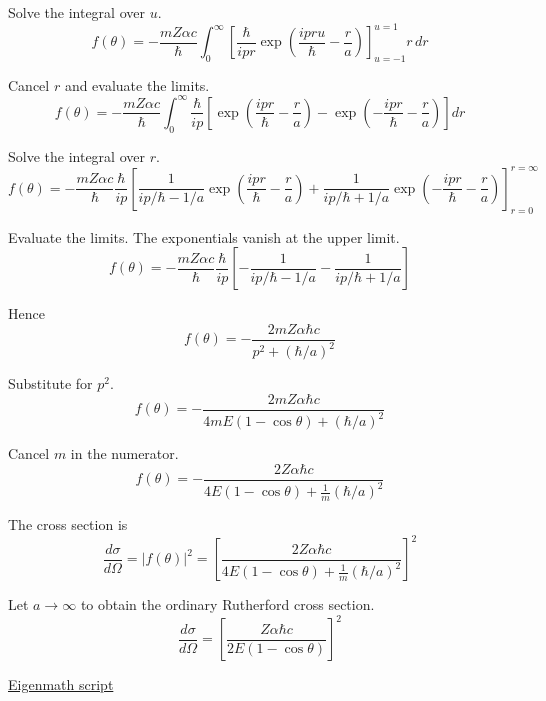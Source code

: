 Solve the integral over $u$.
\begin{equation*}
f(\theta)=-\frac{mZ\alpha c}{\hbar}
\int_0^\infty
\left[\frac{\hbar}{ipr}\exp\left(\frac{ipru}{\hbar}-\frac{r}{a}\right)\right]_{u=-1}^{u=1}
r\,dr
\end{equation*}

Cancel $r$ and evaluate the limits.
\begin{equation*}
f(\theta)=-\frac{mZ\alpha c}{\hbar}
\int_0^\infty
\frac{\hbar}{ip}
\left[\exp\left(\frac{ipr}{\hbar}-\frac{r}{a}\right)
-\exp\left(-\frac{ipr}{\hbar}-\frac{r}{a}\right)\right]
dr
\end{equation*}

Solve the integral over $r$.
\begin{equation*}
f(\theta)=-\frac{mZ\alpha c}{\hbar}
\frac{\hbar}{ip}
\left[
\frac{1}{ip/\hbar-1/a}
\exp\left(\frac{ipr}{\hbar}-\frac{r}{a}\right)
+\frac{1}{ip/\hbar+1/a}
\exp\left(-\frac{ipr}{\hbar}-\frac{r}{a}\right)
\right]_{r=0}^{r=\infty}
\end{equation*}

Evaluate the limits. The exponentials vanish at the upper limit.
\begin{equation*}
f(\theta)=-\frac{mZ\alpha c}{\hbar}
\frac{\hbar}{ip}
\left[
-\frac{1}{ip/\hbar-1/a}
-\frac{1}{ip/\hbar+1/a}
\right]
\tag{1}
\end{equation*}

Hence
\begin{equation*}
f(\theta)=-\frac{2mZ\alpha\hbar c}{p^2+(\hbar/a)^2}
\end{equation*}

Substitute for $p^2$.
\begin{equation*}
f(\theta)=-\frac{2mZ\alpha\hbar c}{4mE(1-\cos\theta)+(\hbar/a)^2}
\tag{2}
\end{equation*}

Cancel $m$ in the numerator.
\begin{equation*}
f(\theta)=-\frac{2Z\alpha\hbar c}{4E(1-\cos\theta)+\frac{1}{m}(\hbar/a)^2}
\end{equation*}

The cross section is
\begin{equation*}
\frac{d\sigma}{d\Omega}=|f(\theta)|^2
=\left[\frac{2Z\alpha\hbar c}{4E(1-\cos\theta)+\frac{1}{m}(\hbar/a)^2}\right]^2
\end{equation*}

Let $a\rightarrow\infty$ to obtain the ordinary Rutherford cross section.
\begin{equation*}
\frac{d\sigma}{d\Omega}
=\left[\frac{Z\alpha\hbar c}{2E(1-\cos\theta)}\right]^2
\end{equation*}

\href{https://georgeweigt.github.io/examples/rutherford-scattering-2-demo.html}{Eigenmath script}


